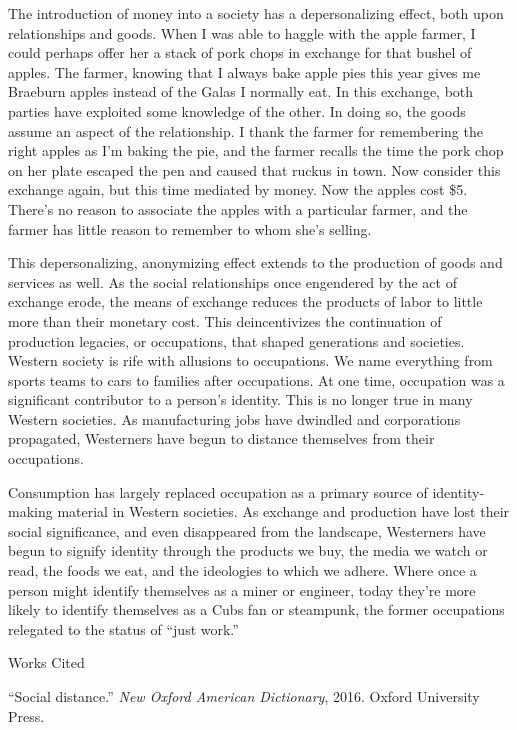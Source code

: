\documentclass[12pt]{article}
\newcommand{\bibent}{\noindent \hangindent 40pt}
\newenvironment{workscited}{\newpage \begin{center} Works Cited \end{center}}{\newpage }
\begin{document}
The introduction of money into a society has a depersonalizing effect, both upon
relationships and goods. When I was able to haggle with the apple farmer, I
could perhaps offer her a stack of pork chops in exchange for that bushel of
apples. The farmer, knowing that I always bake apple pies this year gives me
Braeburn apples instead of the Galas I normally eat. In this exchange, both
parties have exploited some knowledge of the other. In doing so, the goods
assume an aspect of the relationship. I thank the farmer for remembering the
right apples as I'm baking the pie, and the farmer recalls the time the pork
chop on her plate escaped the pen and caused that ruckus in town. Now consider
this exchange again, but this time mediated by money. Now the apples cost \$5.
There's no reason to associate the apples with a particular farmer, and the
farmer has little reason to remember to whom she's selling.

This depersonalizing, anonymizing effect extends to the production of goods and
services as well. As the social relationships once engendered by the act of
exchange erode, the means of exchange reduces the products of labor to little
more than their monetary cost. This deincentivizes the continuation of
production legacies, or occupations, that shaped generations and societies.
Western society is rife with allusions to occupations. We name everything from
sports teams to cars to families after occupations. At one time, occupation was
a significant contributor to a person's identity. This is no longer true in many
Western societies. As manufacturing jobs have dwindled and corporations
propagated, Westerners have begun to distance themselves from their occupations.

Consumption has largely replaced occupation as a primary source of
identity-making material in Western societies. As exchange and production have
lost their social significance, and even disappeared from the landscape,
Westerners have begun to signify identity through the products we buy, the media
we watch or read, the foods we eat, and the ideologies to which we adhere. Where
once a person might identify themselves as a miner or engineer, today they're
more likely to identify themselves as a Cubs fan or steampunk, the former
occupations relegated to the status of ``just work.''

\begin{workscited}
  \bibent
  ``Social distance.'' \emph{New Oxford American Dictionary}, 2016. Oxford University Press.
\end{workscited}
\end{document}
